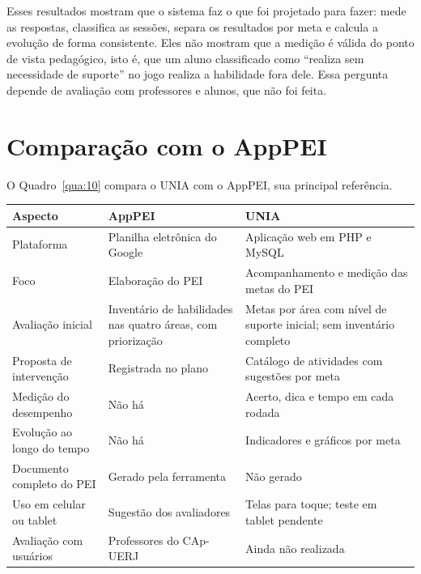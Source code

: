 Esses resultados mostram que o sistema faz o que foi projetado para fazer: mede as respostas, classifica as sessões, separa os resultados por meta e calcula a evolução de forma consistente. Eles não mostram que a medição é válida do ponto de vista pedagógico, isto é, que um aluno classificado como “realiza sem necessidade de suporte” no jogo realiza a habilidade fora dele. Essa pergunta depende de avaliação com professores e alunos, que não foi feita.

\section{Comparação com o AppPEI}\label{sec:5.2}

O Quadro~\ref{qua:10} compara o UNIA com o AppPEI, sua principal referência.

\begin{tabelacurta}
\setlength{\largtab}{\dimexpr\linewidth-6\tabcolsep-4\arrayrulewidth-1pt\relax}
\label{qua:10}\vspace{4pt}
\begin{tabular}{|L{0.2381}|L{0.3617}|L{0.4002}|}
\hline
\textbf{Aspecto} & \textbf{AppPEI} & \textbf{UNIA} \\
\hline
Plataforma & Planilha eletrônica do Google & Aplicação web em PHP e MySQL \\ \hline
Foco & Elaboração do PEI & Acompanhamento e medição das metas do PEI \\ \hline
Avaliação inicial & Inventário de habilidades nas quatro áreas, com priorização & Metas por área com nível de suporte inicial; sem inventário completo \\ \hline
Proposta de intervenção & Registrada no plano & Catálogo de atividades com sugestões por meta \\ \hline
Medição do desempenho & Não há & Acerto, dica e tempo em cada rodada \\ \hline
Evolução ao longo do tempo & Não há & Indicadores e gráficos por meta \\ \hline
Documento completo do PEI & Gerado pela ferramenta & Não gerado \\ \hline
Uso em celular ou tablet & Sugestão dos avaliadores & Telas para toque; teste em tablet pendente \\ \hline
Avaliação com usuários & Professores do CAp-UERJ & Ainda não realizada \\ \hline
\end{tabular}
\end{tabelacurta}

